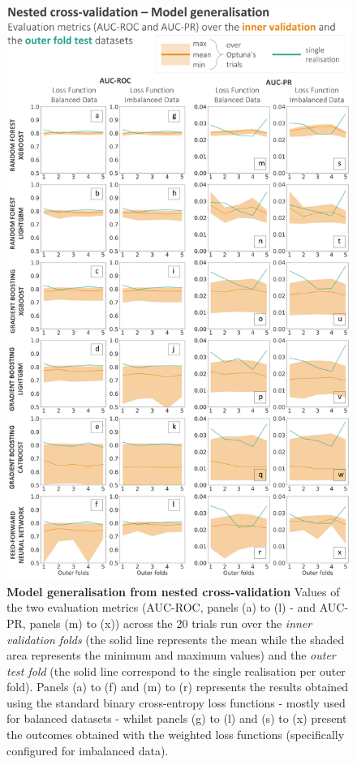 \begin{figure}[htbp]
\centering
\includegraphics[scale=0.9]{chapter_06/figures/optuna_evaluation_metrics.png}
\caption{\textbf{Model generalisation from nested cross-validation} Values of the two evaluation metrics (AUC-ROC, panels (a) to (l) - and AUC-PR, panels (m) to (x)) across the 20 trials run over the \textcolor{colourInnerValidation}{\textit{inner validation folds}} (the \textcolor{colourInnerValidation}{solid line} represents the mean while the \textcolor{colourInnerValidation}{shaded area} represents the minimum and maximum values) and the \textcolor{colourOuterTest}{\textit{outer test fold}} (the \textcolor{colourOuterTest}{solid line} correspond to the single realisation per outer fold). Panels (a) to (f) and (m) to (r) represents the results obtained using the standard binary cross-entropy loss functions - mostly used for balanced datasets - whilst panels (g) to (l) and (s) to (x) present the outcomes obtained with the weighted loss functions (specifically configured for imbalanced data).}
\label{fig:optuna_evaluation_metrics}
\end{figure}


